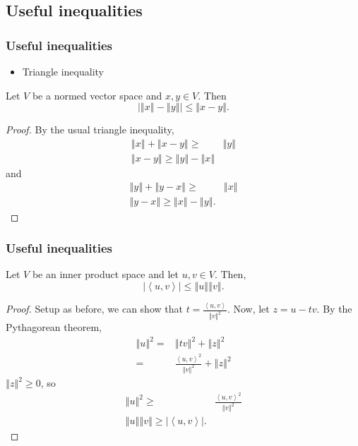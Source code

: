 \documentclass[compress]{beamer}
\newcommand{\iprod}[2]{\left\langle {#1} , {#2} \right\rangle}
\newcommand{\norm}[1]{\left\Vert {#1} \right\Vert}
\begin{document}
\subsection{Useful inequalities}

\begin{frame}
  \frametitle{Useful inequalities}
  \begin{itemize}
  \item Triangle inequality
  \end{itemize}
  \begin{theorem}
    Let $V$ be a normed vector space and $x,y \in V$. Then
    \[ \left| \norm{x} - \norm{y} \right| \leq \norm{x-y}. \]
  \end{theorem}
  \begin{proof}
    By the usual triangle inequality,
    \begin{align*}
      \norm{x} + \norm{x-y} \geq & \norm{y} \\
      \norm{x-y} \geq \norm{y} - \norm{x}
    \end{align*}
    and
    \begin{align*}
      \norm{y} + \norm{y-x} \geq & \norm{x} \\
      \norm{y-x} \geq \norm{x} - \norm{y}.
    \end{align*}
  \end{proof}
\end{frame}
\begin{frame}
  \frametitle{Useful inequalities}
  
  \begin{theorem}
    Let $V$ be an inner product space and let $u,v\in V$. Then,
    \[ \left\vert \iprod{u}{v} \right\vert \leq \norm{u}\norm{v}. \]
  \end{theorem}
  \begin{proof}
    Setup as before, we can show that $t =
    \frac{\iprod{u}{v}}{\norm{v}^2}$. Now, let $z = u-tv$. By the
    Pythagorean theorem,
    \begin{align*}
      \norm{u}^2 = & \norm{tv}^2 + \norm{z}^2 \\
      = & \frac{\iprod{u}{v}^2}{\norm{v}^2} + \norm{z}^2 
    \end{align*}
    $\norm{z}^2\geq 0$, so
    \begin{align*}
      \norm{u}^2 \geq & \frac{\iprod{u}{v}^2}{\norm{v}^2} \\
      \norm{u}\norm{v} \geq |\iprod{u}{v}|.
    \end{align*}
  \end{proof}
\end{frame}
\end{document}
